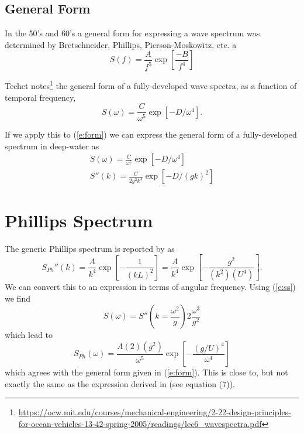 \documentclass[11pt]{article}
\begin{document}
\subsection{General Form}
In the 50's and 60's a general form for expressing a wave spectrum was determined by Bretschneider, Phillips, Pierson-Moskowitz, etc. \cite{ittc02waves} a
\begin{equation}
  S(f) = \frac{A}{f^5} \exp{\left[\frac{-B}{f^4}\right]}
    \label{e:gen}
\end{equation}


Techet notes\footnote{\url{https://ocw.mit.edu/courses/mechanical-engineering/2-22-design-principles-for-ocean-vehicles-13-42-spring-2005/readings/lec6_wavespectra.pdf}} the general form of a fully-developed wave spectra, as a function of temporal frequency,
\begin{equation}
S(\omega) = \frac{C}{\omega^5} \exp{\left[ -D/\omega^4 \right]}.
\label{e:form}
\end{equation}

If we apply this to (\ref{e:form}) we can express the general form of a fully-developed spectrum in deep-water as
\begin{eqnarray}
S(\omega) = \frac{C}{\omega^5} \exp{\left[ -D/\omega^4 \right]} \\
S''(k) = \frac{C}{2 g^2 k^4} \exp{\left[-D/(gk)^2\right]}
\end{eqnarray}

\section{Phillips Spectrum}
The generic Phillips spectrum is reported by \cite{tessendorf99simulating} as 
\begin{equation} S_{Ph}''(k)= \frac{A}{k^4} \exp{\left[ - \frac{1}{(kL)^2} \right]} 
= \frac{A}{k^4} \exp{\left[ - \frac{g^2}{(k^2)(U^4)} \right]} .
\label{e:phk}
\end{equation}
We can convert this to an expression in terms of angular frequency. Using (\ref{e:ss}) we find
\begin{equation}
S(\omega) = S''\left(k=\frac{\omega^2}{g}\right) 2 \frac{\omega^3}{g^2}
\label{e:phw}
\end{equation}
which lead to
\begin{equation}
S_{Ph}(\omega) = \frac{A(2)(g^2)}{\omega^5} \exp{\left[ - \frac{ (g/U)^4 }{\omega^4} \right]}
\end{equation}
which agrees with the general form given in (\ref{e:form}). This is close to, but not exactly the same as the expression derived in \cite{chen2013onthe} (see equation (7)).
\end{document}
